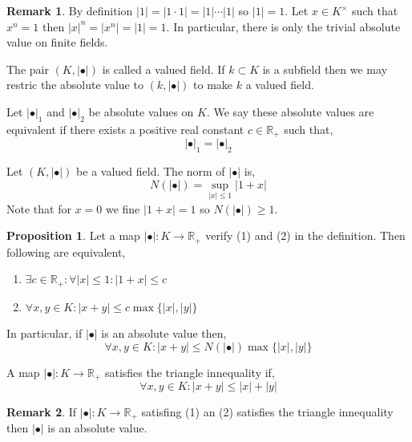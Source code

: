 \documentclass[12pt]{extarticle}
\newcommand{\R}{\mathbb{R}}
\theoremstyle{definition}
\newtheorem{proposition}[theorem]{Proposition}
\newtheorem{remark}{Remark}
\newenvironment{definition}[1][Definition:]{\begin{trivlist}
\item[\hskip \labelsep {\bfseries #1}]}{\end{trivlist}}
\begin{document}
\begin{remark}
By definition $|1| = |1 \cdot 1| = |1| \cdots |1|$ so $|1| = 1$. Let $x \in K^\times$ such that $x^n = 1$ then $|x|^n = |x^n| = |1| = 1$. In particular, there is only the trivial absolute value on finite fields.
\end{remark}

\begin{definition}
The pair $(K, | \bullet|)$ is called a valued field. If $k \subset K$ is a subfield then we may restric the absolute value to $(k, | \bullet |)$ to make $k$ a valued field.
\end{definition}

\begin{definition}
Let $| \bullet |_1$ and $| \bullet |_2$ be absolute values on $K$. We say these absolute values are equivalent if there exists a positive real constant $c \in \R_+$ such that,
\[ | \bullet |_1 = | \bullet |_2 \]
\end{definition}

\begin{definition}
Let $(K, | \bullet |)$ be a valued field. The norm of $| \bullet |$ is,
\[ N(| \bullet |) = \sup_{|x| \le 1} | 1  + x | \]
Note that for $x = 0$ we fine $|1 + x | = 1$ so $N(| \bullet |) \ge 1$.
\end{definition}

\begin{proposition}
Let a map $| \bullet | : K \to \R_{+}$ verify (1) and (2) in the definition. Then following are equivalent,
\begin{enumerate}
\item $\exists c \in \R_{+} : \forall |x| \le 1 : |1 + x| \le c$
\item $\forall x, y \in K : |x + y| \le c \max{\{ |x|, |y| \}}$
\end{enumerate}
In particular, if $| \bullet |$ is an absolute value then,
\[ \forall x,y \in K : | x + y | \le N(| \bullet |) \max{\{ |x|, |y| \}} \]
\end{proposition}

\begin{definition}
A map $| \bullet | : K \to \R_+$ satisfies the triangle innequality if,
\[ \forall x,y \in K : |x + y| \le |x| + |y| \]
\end{definition}

\begin{remark}
If $| \bullet | : K \to \R_{+}$ satisfing (1) an (2) satisfies the triangle innequality then $| \bullet |$ is an absolute value.
\end{remark}
\end{document}
